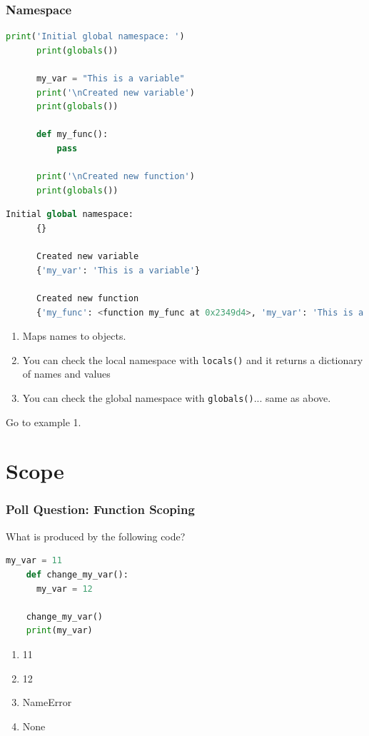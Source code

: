 \documentclass{beamer}
\begin{document}
%
%
\begin{frame}[fragile]
  \frametitle{Namespace}
  \begin{minipage}{0.49\textwidth}
    \begin{lstlisting}[language=Python, autogobble, basicstyle=\tiny]
      print('Initial global namespace: ')
      print(globals())

      my_var = "This is a variable"
      print('\nCreated new variable')
      print(globals())

      def my_func():
          pass

      print('\nCreated new function')
      print(globals())
    \end{lstlisting}
  \end{minipage}
  \begin{minipage}{0.49\textwidth}
    \begin{lstlisting}[language=Python, autogobble, basicstyle=\tiny]
      Initial global namespace: 
      {}

      Created new variable
      {'my_var': 'This is a variable'}

      Created new function
      {'my_func': <function my_func at 0x2349d4>, 'my_var': 'This is a variable'}
    \end{lstlisting}
  \end{minipage}
  \vfill
  \begin{enumerate}
    \item Maps names to objects.
    \item You can check the local namespace with \lstinline|locals()| and it returns a dictionary of names and values
    \item You can check the global namespace with \lstinline|globals()|... same as above.
  \end{enumerate}
  \pause
  \vfill
  Go to example 1.
\end{frame}

\section{Scope}

%
%
%
\begin{frame}[fragile]
  \frametitle{Poll Question: Function Scoping}
  \begin{minipage}{0.69\textwidth}
    What is produced by the following code?
    \begin{lstlisting}[language=Python, autogobble]
    my_var = 11
    def change_my_var():
      my_var = 12

    change_my_var()
    print(my_var)
    \end{lstlisting}
  \end{minipage}
  \hfill
  \begin{minipage}{0.29\textwidth}
    \begin{enumerate}[A]
      \item 11
      \item 12
      \item NameError
      \item None
    \end{enumerate}
  \end{minipage}
\end{frame}
\end{document}
